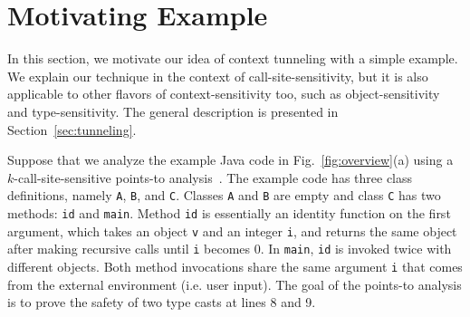 \newpage
\section{Motivating Example}
\label{sec:overview}

In this section, we motivate our idea of context tunneling with a simple example. We
explain our technique in the context of call-site-sensitivity, but it
is also applicable
to other flavors of context-sensitivity too, such as object-sensitivity and
type-sensitivity. The general description is presented in
Section~\ref{sec:tunneling}.


Suppose that we analyze the example Java code in
Fig.~\ref{fig:overview}(a) using a $k$-call-site-sensitive points-to
analysis~\cite{Smaragdakis2015}.  The example code has three class
definitions, namely \texttt{A}, \texttt{B}, and \texttt{C}.  Classes
\texttt{A} and \texttt{B} are empty and class \texttt{C} has two
methods: \texttt{id} and \texttt{main}.  Method \texttt{id} is
essentially an identity function on the first argument, which takes an
object \texttt{v} and an integer \texttt{i}, and returns the same
object after making recursive calls until \texttt{i} becomes 0. In
\texttt{main}, \texttt{id} is invoked twice with different
objects. Both method invocations share the same argument \texttt{i}
that comes from the external environment (i.e. user input).  The goal
of the points-to analysis is to prove the safety of two type casts at
lines 8 and 9.

